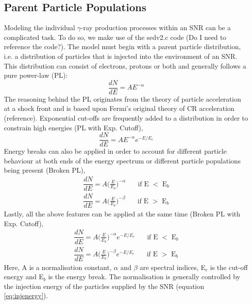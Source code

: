 \documentclass[12pt,a4paper]{article}
\begin{document}
\subsection{Parent Particle Populations}
Modeling the individual $\gamma$-ray production processes within an SNR can be a complicated task. To do so, we make use of the sedv2.c code (Do I need to reference the code?). The model must begin with a parent particle distribution, i.e. a distribution of particles that is injected into the environment of an SNR. This distribution can consist of electrons, protons or both and generally follows a pure power-law (PL):
\begin{equation} \label{eq:1}
\dfrac{dN}{dE} = A E^{-\alpha}
\end{equation}
The reasoning behind the PL originates from the theory of particle acceleration at a shock front and is based upon Fermi's original theory of CR acceleration (reference). Exponential cut-offs are frequently added to a distribution in order to constrain high energies (PL with Exp. Cutoff),
\begin{equation} \label{eq:2}
\dfrac{dN}{dE} = A E^{-\alpha} e^{-E/E_c}
\end{equation}
Energy breaks can also be applied in order to account for different particle behaviour at both ends of the energy spectrum or different particle populations being present (Broken PL),
\begin{equation}\label{eq:3}
\begin{split}
\dfrac{dN}{dE} = A \Bigg(\frac{E}{E_b}\Bigg)^{-\alpha}\ \ \ \ \ \ \ \ \text{if E $<$ E$_{b}$}\\
\dfrac{dN}{dE} = A \Bigg(\frac{E}{E_b}\Bigg)^{-\beta}\ \ \ \ \ \ \ \ \text{if E $>$ E$_{b}$}
\end{split}
\end{equation}
Lastly, all the above features can be applied at the same time (Broken PL with Exp. Cutoff),
\begin{equation} \label{eq:4}
\begin{split}
\dfrac{dN}{dE} = A \Bigg(\frac{E}{E_b}\Bigg)^{-\alpha}e^{-E/E_c}\ \ \ \ \ \ \ \ \text{if E $<$ E$_{b}$}\\
\dfrac{dN}{dE} = A \Bigg(\frac{E}{E_b}\Bigg)^{-\beta}e^{-E/E_c}\ \ \ \ \ \ \ \ \text{if E $>$ E$_{b}$}
\end{split}
\end{equation}
Here, A is a normalisation constant, $\alpha$ and $\beta$ are spectral indices, E$_c$ is the cut-off energy and E$_b$ is the energy break. The normalisation is generally controlled by the injection energy of the particles supplied by the SNR (equation \ref{eq:injenergy}). 
\end{document}
